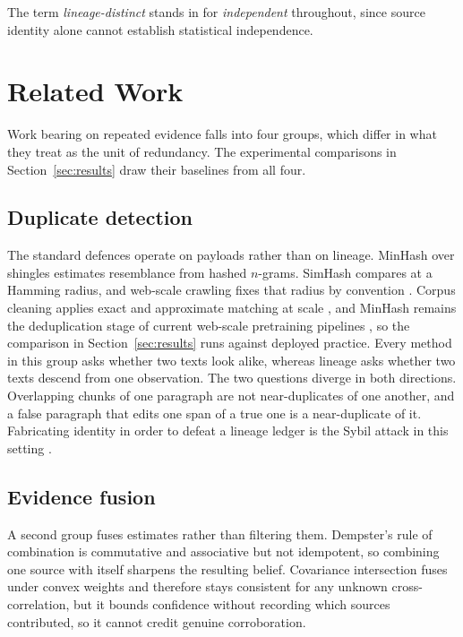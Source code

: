 \documentclass{article}
\begin{document}
The term \emph{lineage-distinct} stands in for \emph{independent} throughout,
since source identity alone cannot establish statistical independence.


\section{Related Work}
\label{sec:related}

Work bearing on repeated evidence falls into four groups, which differ in what
they treat as the unit of redundancy. The experimental comparisons in
Section~\ref{sec:results} draw their baselines from all four.

\subsection{Duplicate detection}
The standard defences operate on payloads rather than on lineage. MinHash over
shingles \citep{broder1997resemblance} estimates resemblance from hashed
$n$-grams. SimHash \citep{charikar2002simhash} compares at a Hamming radius, and
web-scale crawling fixes that radius by convention
\citep{manku2007nearduplicate}. Corpus cleaning applies exact and approximate
matching at scale \citep{lee2022deduplicating}, and MinHash remains the
deduplication stage of current web-scale pretraining pipelines
\citep{penedo2024fineweb}, so the comparison in Section~\ref{sec:results} runs
against deployed practice. Every method in this group asks whether two texts
look alike, whereas lineage asks whether two texts descend from one observation.
The two questions diverge in both directions. Overlapping chunks of one
paragraph are not near-duplicates of one another, and a false paragraph that
edits one span of a true one is a near-duplicate of it. Fabricating identity in
order to defeat a lineage ledger is the Sybil attack in this setting
\citep{douceur2002sybil}.

\subsection{Evidence fusion}
A second group fuses estimates rather than filtering them. Dempster's rule of
combination \citep{shafer1976dempster} is commutative and associative but not
idempotent, so combining one source with itself sharpens the resulting belief.
Covariance intersection \citep{julier1997ci} fuses under convex weights and
therefore stays consistent for any unknown cross-correlation, but it bounds
confidence without recording which sources contributed, so it cannot credit
genuine corroboration.
\end{document}
